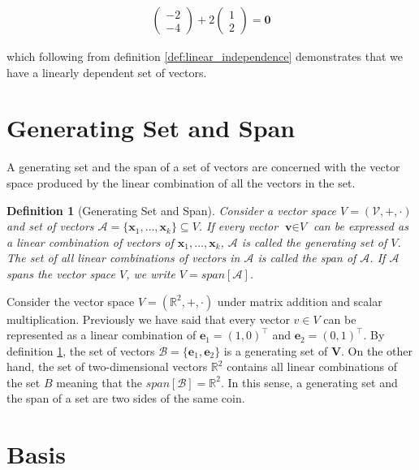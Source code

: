 \documentclass[a4paper,12pt]{book}
\newcommand{\set}[1]{\mathcal{#1}}
\newcommand{\vectr}[1]{\textbf{#1}}
\newcommand{\real}{\mathbb{R}}
\newcommand{\italic}[1]{\textit{#1}}
\newtheorem{definition}{Definition}[section]
\begin{document}
	\begin{align}
		\begin{pmatrix} -2 \\ -4 \end{pmatrix} + 2 \begin{pmatrix} 1 \\ 2 \end{pmatrix} = \vectr{0}
	\end{align}
	
	which following from definition \ref{def:linear_independence} demonstrates that we have a linearly dependent set of vectors.
	\section{Generating Set and Span}
	
	A generating set and the span \cite{mml_generating_set_span_44} of a set of vectors are concerned with the vector space produced by the linear combination of all the vectors in the set.
	
	\begin{definition}[Generating Set and Span]
		\normalfont Consider a vector space $\italic{V} = (\set{V}, +, \cdot)$ and set of vectors $\set{A} = \{\vectr{x}_1,\ldots,\vectr{x}_k\} \subseteq \italic{V}$. If every vector $\vectr{v} \in \italic{V}$ can be expressed as a linear combination of vectors of $\vectr{x}_1,\ldots,\vectr{x}_k$, $\set{A}$ is called the generating set of $\italic{V}$. The set of all linear combinations of vectors in $\set{A}$ is called the span of $\set{A}$. If $\set{A}$ spans the vector space $\italic{V}$, we write $\italic{V} = span[\set{A}]$. 
		\label{def:generating_set_span}
	\end{definition}
	
	Consider the vector space $ V = (\real^{2}, +, \cdot) $ under matrix addition and scalar multiplication. Previously we have said that every vector $ v \in V $ can be represented as a linear combination of $\vectr{e}_1 = (1, 0)^{\top}$ and $\vectr{e}_2 = (0, 1)^{\top}$. By definition \ref{def:generating_set_span}, the set of vectors $ \set{B} = \{ \vectr{e}_1, \vectr{e}_2 \} $ is a generating set of $ \vectr{V} $. 
	On the other hand, the set of two-dimensional vectors $ \real^{2} $ contains all linear combinations of the set $ B $ meaning that the $ span[\set{B}] = \real^{2} $. In this sense, a generating set and the span of a set are two sides of the same coin.
	\section{Basis}
	
\end{document}
